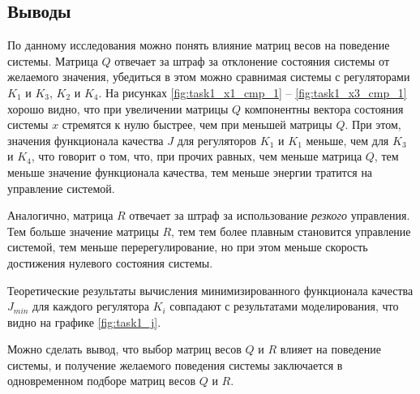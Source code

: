 \subsection{Выводы}
По данному исследования можно понять влияние матриц весов на поведение системы. 
Матрица $Q$ отвечает за штраф за отклонение состояния системы от желаемого значения, 
убедиться в этом можно сравнимая системы с регуляторами $K_1$ и $K_3$, $K_2$ и $K_4$. 
На рисунках \ref{fig:task1_x1_cmp_1} -- \ref{fig:task1_x3_cmp_1} хорошо видно, что при увеличении матрицы $Q$
компонентны вектора состояния системы $x$ стремятся к нулю быстрее, чем при меньшей матрицы $Q$. При этом, 
значения функционала качества $J$ для регуляторов $K_1$ и $K_1$ меньше, чем для $K_3$ и $K_4$, что 
говорит о том, что, при прочих равных, чем меньше матрица $Q$, тем меньше значение функционала качества, тем 
меньше энергии тратится на управление системой. 

Аналогично, матрица $R$ отвечает за штраф за использование \textit{резкого} управления. Тем больше значение 
матрицы $R$, тем тем более плавным становится управление системой, тем меньше перерегулирование, но при этом 
меньше скорость достижения нулевого состояния системы.  

Теоретические результаты вычисления минимизированного функционала качества $J_{min}$ для каждого регулятора $K_i$ совпадают с результатами моделирования, 
что видно на графике \ref{fig:task1_j}. 

Можно сделать вывод, что выбор матриц весов $Q$ и $R$ влияет на поведение системы, и получение желаемого поведения системы 
заключается в одновременном подборе матриц весов $Q$ и $R$. 